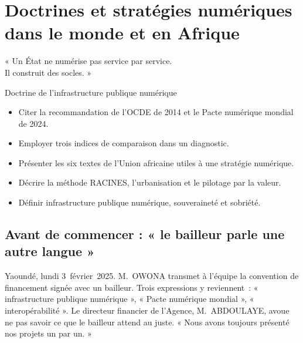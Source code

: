 
\chapter{Doctrines et stratégies numériques dans le monde et en Afrique}
\label{chap:doctrines}

\epigraph{%
    « Un État ne numérise pas service par service.\\
    Il construit des socles. »%
}{Doctrine de l'infrastructure publique numérique}


\begin{boxobjectifs}
\begin{itemize}
    \item Citer la recommandation de l'OCDE de 2014 et le Pacte numérique mondial de 2024.
    \item Employer trois indices de comparaison dans un diagnostic.
    \item Présenter les six textes de l'Union africaine utiles à une stratégie numérique.
    \item Décrire la méthode RACINES, l'urbanisation et le pilotage par la valeur.
    \item Définir infrastructure publique numérique, souveraineté et sobriété.
\end{itemize}
\end{boxobjectifs}

\bigskip

\section*{Avant de commencer : « le bailleur parle une autre langue »}

Yaoundé, lundi 3~février~2025. M.~OWONA transmet à l'équipe la convention de financement
signée avec un bailleur. Trois expressions y reviennent~: « infrastructure publique numérique », « Pacte numérique
mondial », « interopérabilité ». Le directeur financier de l'Agence, M.~ABDOULAYE, avoue ne pas savoir ce que le
bailleur attend au juste. « Nous avons toujours présenté nos projets un par un. »

